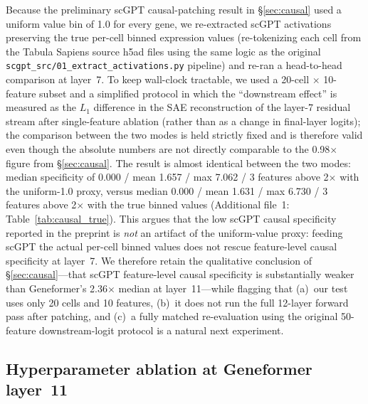 \documentclass[onecolumn]{article}
\begin{document}
Because the preliminary scGPT causal-patching result in \S\ref{sec:causal} used a uniform value bin of 1.0 for every gene, we re-extracted scGPT activations preserving the true per-cell binned expression values (re-tokenizing each cell from the Tabula Sapiens source h5ad files using the same logic as the original \texttt{scgpt\_src/01\_extract\_activations.py} pipeline) and re-ran a head-to-head comparison at layer~7. To keep wall-clock tractable, we used a 20-cell $\times$ 10-feature subset and a simplified protocol in which the ``downstream effect'' is measured as the $L_1$ difference in the SAE reconstruction of the layer-7 residual stream after single-feature ablation (rather than as a change in final-layer logits); the comparison between the two modes is held strictly fixed and is therefore valid even though the absolute numbers are not directly comparable to the 0.98$\times$ figure from \S\ref{sec:causal}. The result is almost identical between the two modes: median specificity of 0.000 / mean 1.657 / max 7.062 / 3 features above 2$\times$ with the uniform-1.0 proxy, versus median 0.000 / mean 1.631 / max 6.730 / 3 features above 2$\times$ with the true binned values (Additional file~1: Table~\ref{tab:causal_true}). This argues that the low scGPT causal specificity reported in the preprint is \emph{not} an artifact of the uniform-value proxy: feeding scGPT the actual per-cell binned values does not rescue feature-level causal specificity at layer~7. We therefore retain the qualitative conclusion of \S\ref{sec:causal}---that scGPT feature-level causal specificity is substantially weaker than Geneformer's 2.36$\times$ median at layer~11---while flagging that (a)~our test uses only 20 cells and 10 features, (b)~it does not run the full 12-layer forward pass after patching, and (c)~a fully matched re-evaluation using the original 50-feature downstream-logit protocol is a natural next experiment.

\subsection{Hyperparameter ablation at Geneformer layer~11}
\label{sec:hyperparam}
\end{document}
